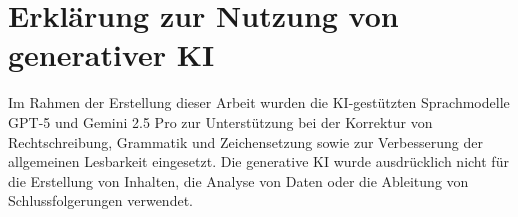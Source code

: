 \chapter*{Erklärung zur Nutzung von generativer KI}
\medskip
\noindent
Im Rahmen der Erstellung dieser Arbeit wurden die \ac{KI}-gestützten Sprachmodelle GPT-5 und Gemini 2.5 Pro zur Unterstützung bei der Korrektur von Rechtschreibung, Grammatik und Zeichensetzung sowie zur Verbesserung der allgemeinen Lesbarkeit eingesetzt.
Die generative \ac{KI} wurde ausdrücklich nicht für die Erstellung von Inhalten, die Analyse von Daten oder die Ableitung von Schlussfolgerungen verwendet.